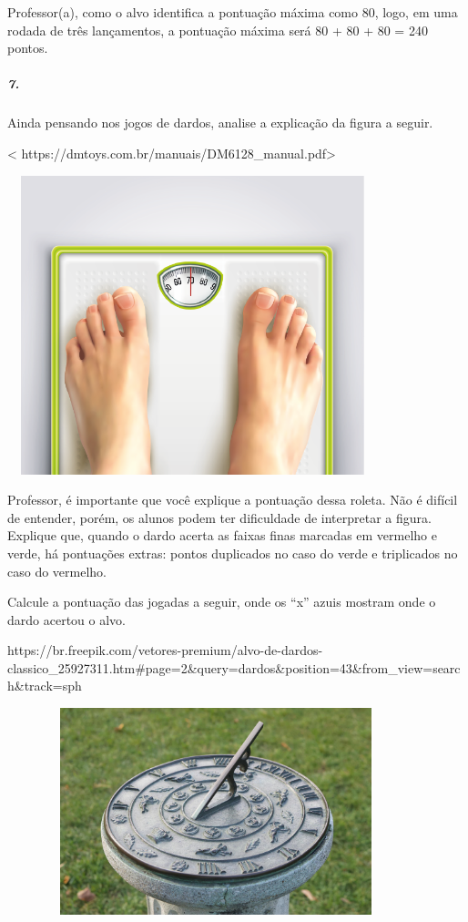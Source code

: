 Professor(a), como o alvo identifica a pontuação máxima como 80, logo,
em uma rodada de três lançamentos, a pontuação máxima será 80 + 80 + 80 =
240 pontos.

\subparagraph{7.}\label{section-20}

Ainda pensando nos jogos de dardos, analise a explicação da figura a seguir.

\textless{}
https://dmtoys.com.br/manuais/DM6128\_manual.pdf\textgreater{}

\includegraphics[width=4.23958in,height=3.41667in]{media/image32.png}

Professor, é importante que você explique a pontuação dessa roleta. Não
é difícil de entender, porém, os alunos podem ter dificuldade de
interpretar a figura. Explique que, quando o dardo acerta as faixas finas marcadas em vermelho e verde, há pontuações extras: pontos duplicados no caso do verde e triplicados no caso do vermelho.

Calcule a pontuação das jogadas a seguir, onde os ``x'' azuis mostram onde o dardo acertou o alvo.

https://br.freepik.com/vetores-premium/alvo-de-dardos-classico\_25927311.htm\#page=2\&query=dardos\&position=43\&from\_view=search\&track=sph

\includegraphics[width=4.77085in,height=2.36458in]{media/image33.png}

